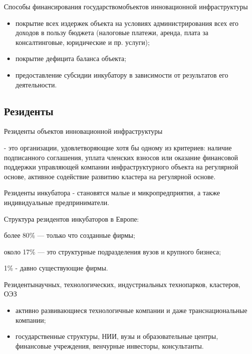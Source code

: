 \documentclass[_Venture_p3.tex]{subfiles}
\begin{document}
\begin{frame}[allowframebreaks]{Способы финансирования государством}{объектов инновационной инфраструктуры}
\begin{itemize}
	\item покрытие всех издержек объекта на условиях администрирования всех его доходов в пользу бюджета (налоговые платежи, аренда, плата за консалтинговые, юридические и пр. услуги);
	
	\pagebreak
	\item покрытие дефицита баланса объекта;
	\item предоставление субсидии инкубатору в зависимости от результатов его деятельности.
\end{itemize}
\end{frame}


\subsection{Резиденты}
 
\begin{frame}{Резиденты объектов инновационной инфраструктуры}
\begin{block}{}
	\quad
	- это организации, удовлетворяющие хотя бы одному из критериев:
	 наличие подписанного соглашения, уплата членских взносов или оказание финансовой поддержки управляющей компании инфраструктурного объекта на регулярной основе, активное содействие развитию кластера на регулярной основе.
\end{block}
\end{frame}

 
\begin{frame}{}
\begin{block}{Резиденты инкубатора}
	\quad
	- становятся малые и микропредприятия, а также индивидуальные предприниматели.
\end{block}
Структура резидентов инкубаторов в Европе: 

более 80\% — только что созданные фирмы; 

около 17\% — это структурные подразделения вузов и крупного бизнеса;

1\% - давно существующие фирмы.
\end{frame}

 
\begin{frame}[allowframebreaks]{Резиденты}{научных, технологических, индустриальных технопарков, кластеров, ОЭЗ}
\begin{itemize}
	\item активно развивающиеся технологичные компании и даже транснациональные компании;
	\item государственные структуры, НИИ, вузы и образовательные центры, финансовые учреждения, венчурные инвесторы, консультанты.
\end{itemize}
\end{frame}
\end{document}
